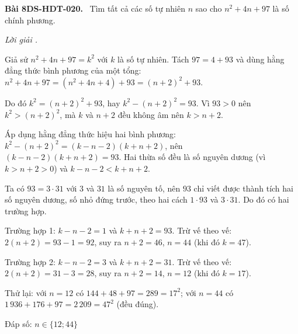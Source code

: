 \documentclass[12pt,a4paper]{article}
\newenvironment{problem}[1][]{\par\medskip\noindent\textbf{Bài #1.}\ }{\par}
\newenvironment{solution}[1][]{\par\noindent\textit{Lời giải #1.}\par}{\par}
\begin{document}
\begin{problem}[8DS-HDT-020]
Tìm tất cả các số tự nhiên $n$ sao cho $n^2 + 4n + 97$ là số chính phương.

\begin{solution}
Giả sử $n^2 + 4n + 97 = k^2$ với $k$ là số tự nhiên. Tách $97 = 4 + 93$ và dùng hằng đẳng thức bình phương của một tổng: $n^2 + 4n + 97 = (n^2 + 4n + 4) + 93 = (n + 2)^2 + 93$.

Do đó $k^2 = (n + 2)^2 + 93$, hay $k^2 - (n + 2)^2 = 93$. Vì $93 > 0$ nên $k^2 > (n + 2)^2$, mà $k$ và $n + 2$ đều không âm nên $k > n + 2$.

Áp dụng hằng đẳng thức hiệu hai bình phương: $k^2 - (n + 2)^2 = (k - n - 2)(k + n + 2)$, nên $(k - n - 2)(k + n + 2) = 93$. Hai thừa số đều là số nguyên dương (vì $k > n + 2 > 0$) và $k - n - 2 < k + n + 2$.

Ta có $93 = 3 \cdot 31$ với $3$ và $31$ là số nguyên tố, nên $93$ chỉ viết được thành tích hai số nguyên dương, số nhỏ đứng trước, theo hai cách $1 \cdot 93$ và $3 \cdot 31$. Do đó có hai trường hợp.

Trường hợp 1: $k - n - 2 = 1$ và $k + n + 2 = 93$. Trừ vế theo vế: $2(n + 2) = 93 - 1 = 92$, suy ra $n + 2 = 46$, $n = 44$ (khi đó $k = 47$).

Trường hợp 2: $k - n - 2 = 3$ và $k + n + 2 = 31$. Trừ vế theo vế: $2(n + 2) = 31 - 3 = 28$, suy ra $n + 2 = 14$, $n = 12$ (khi đó $k = 17$).

Thử lại: với $n = 12$ có $144 + 48 + 97 = 289 = 17^2$; với $n = 44$ có $1\,936 + 176 + 97 = 2\,209 = 47^2$ (đều đúng).

Đáp số: $\boxed{n \in \{12; 44\}}$
\end{solution}
\end{problem}
\end{document}

